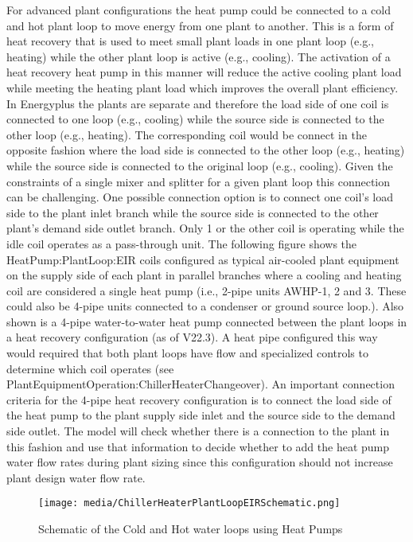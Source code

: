 For advanced plant configurations the heat pump could be connected to a cold and hot plant loop to move energy from one plant to another. This is a form of heat recovery that is used to meet small plant loads in one plant loop (e.g., heating) while the other plant loop is active (e.g., cooling). The activation of a heat recovery heat pump in this manner will reduce the active cooling plant load while meeting the heating plant load which improves the overall plant efficiency. In Energyplus the plants are separate and therefore the load side of one coil is connected to one loop (e.g., cooling) while the source side is connected to the other loop (e.g., heating). The corresponding coil would be connect in the opposite fashion where the load side is connected to the other loop (e.g., heating) while the source side is connected to the original loop (e.g., cooling). Given the constraints of a single mixer and splitter for a given plant loop this connection can be challenging. One possible connection option is to connect one coil's load side to the plant inlet branch while the source side is connected to the other plant's demand side outlet branch. Only 1 or the other coil is operating while the idle coil operates as a pass-through unit. The following figure shows the HeatPump:PlantLoop:EIR coils configured as typical air-cooled plant equipment on the supply side of each plant in parallel branches where a cooling and heating coil are considered a single heat pump (i.e., 2-pipe units AWHP-1, 2 and 3. These could also be 4-pipe units connected to a condenser or ground source loop.). Also shown is a 4-pipe water-to-water heat pump connected between the plant loops in a heat recovery configuration (as of V22.3). A heat pipe configured this way would required that both plant loops have flow and specialized controls to determine which coil operates (see PlantEquipmentOperation:ChillerHeaterChangeover). An important connection criteria for the 4-pipe heat recovery configuration is to connect the load side of the heat pump to the plant supply side inlet and the source side to the demand side outlet. The model will check whether there is a connection to the plant in this fashion and use that information to decide whether to add the heat pump water flow rates during plant sizing since this configuration should not increase plant design water flow rate.

\begin{figure}[hbtp]
\centering
\texttt{[image: media/ChillerHeaterPlantLoopEIRSchematic.png]}
\caption{Schematic of the Cold and Hot water loops using Heat Pumps \protect \label{fig:schematic-of-the-energyplus-cold-and-hot-plant-loop-heat-pumps}}
\end{figure}

